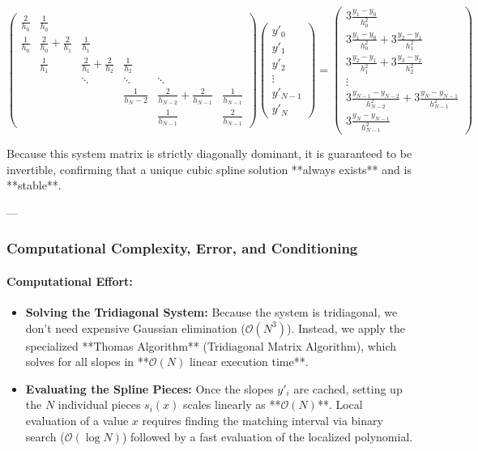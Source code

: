 \documentclass{article}
\begin{document}
\[
\begin{pmatrix}
\frac{2}{h_0} & \frac{1}{h_0} & & & & \\
\frac{1}{h_0} & \frac{2}{h_0} + \frac{2}{h_1} & \frac{1}{h_1} & & & \\
& \frac{1}{h_1} & \frac{2}{h_1} + \frac{2}{h_2} & \frac{1}{h_2} & & \\
& & \ddots & \ddots & \ddots & \\
& & & \frac{1}{h_N-2} & \frac{2}{h_{N-2}} + \frac{2}{h_{N-1}} & \frac{1}{h_{N-1}} \\
& & & & \frac{1}{h_{N-1}} & \frac{2}{h_{N-1}}
\end{pmatrix}
\begin{pmatrix}
y'_0 \\
y'_1 \\
y'_2 \\
\vdots \\
y'_{N-1} \\
y'_N
\end{pmatrix}
=
\begin{pmatrix}
3\frac{y_1 - y_0}{h_0^2} \\
3\frac{y_1 - y_0}{h_0^2} + 3\frac{y_2 - y_1}{h_1^2} \\
3\frac{y_2 - y_1}{h_1^2} + 3\frac{y_3 - y_2}{h_2^2} \\
\vdots \\
3\frac{y_{N-1} - y_{N-2}}{h_{N-2}^2} + 3\frac{y_N - y_{N-1}}{h_{N-1}^2} \\
3\frac{y_N - y_{N-1}}{h_{N-1}^2}
\end{pmatrix}
\]

Because this system matrix is strictly diagonally dominant, it is guaranteed to be invertible, confirming that a unique cubic spline solution **always exists** and is **stable**.

---

\subsubsection{Computational Complexity, Error, and Conditioning}

\paragraph{Computational Effort:}
\begin{itemize}
    \item \textbf{Solving the Tridiagonal System:} Because the system is tridiagonal, we don't need expensive Gaussian elimination ($\mathcal{O}(N^3)$). Instead, we apply the specialized **Thomas Algorithm** (Tridiagonal Matrix Algorithm), which solves for all slopes in **$\mathcal{O}(N)$ linear execution time**.
    \item \textbf{Evaluating the Spline Pieces:} Once the slopes $y'_i$ are cached, setting up the $N$ individual pieces $s_i(x)$ scales linearly as **$\mathcal{O}(N)$**. Local evaluation of a value $x$ requires finding the matching interval via binary search ($\mathcal{O}(\log N)$) followed by a fast evaluation of the localized polynomial.
\end{itemize}
\end{document}
